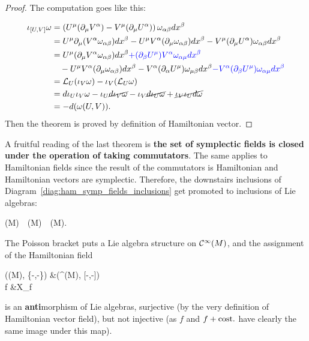 \documentclass[main.tex]{subfiles}
\begin{document}
\begin{proof}
	The computation goes like this:

	\begin{equation}
		\begin{aligned}
			\iota_{[U,V]} \omega &= \left( U^\mu (\partial_\mu V^\alpha) - V^\mu (\partial_\mu U^\alpha) \right) \omega_{\alpha\beta} dx^\beta\\
			&= U^\mu \partial_\mu (V^\alpha \omega_{\alpha\beta}) dx^\beta - U^\mu V^\alpha (\partial_\mu \omega_{\alpha\beta}) dx^\beta - V^\mu (\partial_\mu U^\alpha) \omega_{\alpha\beta}dx^\beta\\
			&= U^\mu (\partial_\mu V^\alpha \omega_{\alpha\beta}) dx^\beta \textcolor{blue}{+ (\partial_\beta U^\mu) V^\alpha \omega_{\alpha \mu} dx^\beta}\\
			&\quad - U^\mu V^\alpha (\partial_\mu \omega_{\alpha\beta}) dx^\beta - V^\alpha (\partial_\alpha U^\mu) \omega_{\mu\beta}dx^\beta \textcolor{blue}{- V^\alpha (\partial_\beta U^\mu) \omega_{\alpha \mu} dx^\beta}\\
			&= \mathcal{L}_{U} (\iota_{V} \omega) - \iota_{V} (\mathcal{L}_{U}\omega)\\
			&= d \iota_{U} \iota_{V} \omega - \iota_{U} \cancel{d\iota_{V} \omega} - \iota_{V} \cancel{d \iota_{U} \omega} + \cancel{\iota_{V} \iota_{U} d\omega}\\
			&= -d (\omega(U,V)).
		\end{aligned}
	\end{equation}
	Then the theorem is proved by definition of Hamiltonian vector.
\end{proof}

\begin{remark}
	A fruitful reading of the last theorem is \textbf{the set of symplectic fields is closed under the operation of taking commutators}. The same applies to Hamiltonian fields since the result of the commutators is Hamiltonian and Hamiltonian vectors are symplectic. Therefore, the downstairs inclusions of Diagram~\ref{diag:ham_symp_fields_inclusions} get promoted to inclusions of Lie algebras:
	\begin{eqalign}
		\hamfields(M)\ \subseteq\ \sympfields(M)\ \subseteq\ \fields(M).
	\end{eqalign}
\end{remark}

\begin{corollary}
	The Poisson bracket puts a Lie algebra structure on $\mathcal{C}^\infty(M)$, and the assignment of the Hamiltonian field
	\begin{eqalign}
		(\Cinfty(M), \{-,-\}) &\longto (\fields^{}(M), [-,-])\\
		f &\longmapsto X_f
	\end{eqalign}
	is an \textbf{anti}morphism of Lie algebras, surjective (by the very definition of Hamiltonian vector field), but not injective (as $f$ and $f+\text{cost.}$ have clearly the same image under this map).
\end{corollary}
\end{document}
